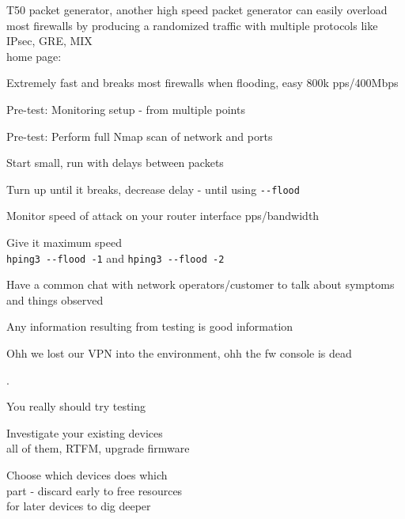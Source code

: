 \documentclass[Screen16to9,17pt]{foils}
\begin{document}
\begin{list2}
\item T50 packet generator, another high speed packet generator
can easily overload most firewalls by producing a randomized traffic with multiple protocols like IPsec, GRE, MIX \\
home page: 
\end{list2}

\centerline{Extremely fast and breaks most firewalls when flooding, easy 800k pps/400Mbps}


\begin{list2}
\item Pre-test: Monitoring setup - from multiple points
\item Pre-test: Perform full Nmap scan of network and ports
\item Start small, run with delays between packets
\item Turn up until it breaks, decrease delay - until using \verb+--flood+
\item Monitor speed of attack on your router interface pps/bandwidth
\item Give it maximum speed\\
 \verb+hping3 --flood -1+ and \verb+hping3 --flood -2+
\item Have a common chat with network operators/customer to talk about symptoms and things observed
\item Any information resulting from testing is good information
\end{list2}

\vskip 1cm
\centerline{Ohh we lost our VPN into the environment, ohh the fw console is dead}



.
\begin{list1}
\item You really should try testing
\item Investigate your existing devices\\
all of them, RTFM, upgrade firmware
\item Choose which devices does which\\
part - discard early to free resources\\
for later devices to dig deeper
\end{list1}
\end{document}
